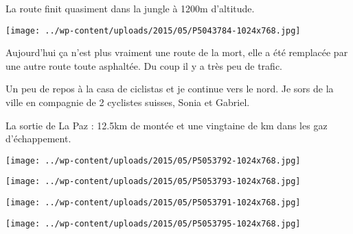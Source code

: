  

 La route finit quasiment dans la jungle à 1200m d'altitude. 

 

\begin{center} \texttt{[image: ../wp-content/uploads/2015/05/P5043784-1024x768.jpg]} \end{center}

 

 Aujourd'hui ça n'est plus vraiment une route de la mort, elle a été remplacée par une autre route toute asphaltée. Du coup il y a très peu de trafic.

 Un peu de repos à la casa de ciclistas et je continue vers le nord. Je sors de la ville en compagnie de 2 cyclistes suisses, Sonia et Gabriel. 

 La sortie de La Paz : 12.5km de montée et une vingtaine de km dans les gaz d'échappement. 

 

\begin{center} \texttt{[image: ../wp-content/uploads/2015/05/P5053792-1024x768.jpg]} \end{center}

 

 

\begin{center} \texttt{[image: ../wp-content/uploads/2015/05/P5053793-1024x768.jpg]} \end{center}

 

 

\begin{center} \texttt{[image: ../wp-content/uploads/2015/05/P5053791-1024x768.jpg]} \end{center}

 

 

\begin{center} \texttt{[image: ../wp-content/uploads/2015/05/P5053795-1024x768.jpg]} \end{center}




 
 
